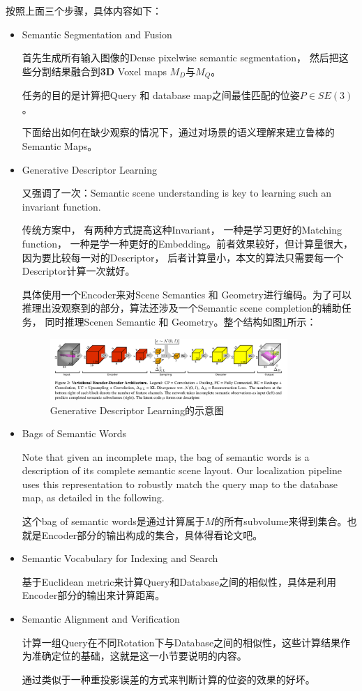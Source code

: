 按照上面三个步骤，具体内容如下：
\begin{itemize}
\item Semantic Segmentation and Fusion

首先生成所有输入图像的Dense pixelwise semantic segmentation， 然后把这些分割结果融合到\textbf{3D} Voxel maps $M_D$与$M_Q$。 

任务的目的是计算把Query 和 database map之间最佳匹配的位姿$P \in SE(3)$。

下面给出如何在缺少观察的情况下，通过对场景的语义理解来建立鲁棒的Semantic Maps。

\item Generative Descriptor Learning

又强调了一次：Semantic scene understanding is key to learning such an invariant function.

传统方案中， 有两种方式提高这种Invariant， 一种是学习更好的Matching function， 一种是学一种更好的Embedding。前者效果较好，但计算量很大，因为要比较每一对的Descriptor， 后者计算量小，本文的算法只需要每一个Descriptor计算一次就好。

具体使用一个Encoder来对Scene Semantics 和 Geometry进行编码。为了可以推理出没观察到的部分，算法还涉及一个Semantic scene completion的辅助任务， 同时推理Scenen Semantic 和 Geometry。整个结构如图\ref{SemanticVisualLoc0}所示：
\begin{figure}[!hbtp]
\centering
\includegraphics[width=0.85\textwidth]{SemanticSLAM/SemanticVisualLoc0.png}
\caption{Generative Descriptor Learning的示意图}
\label{SemanticVisualLoc0}
\end{figure}

\item Bags of Semantic Words

 Note that given an incomplete map, the bag of semantic words is a description of its complete
semantic scene layout. Our localization pipeline uses this representation to robustly match the query map to the database map, as detailed in the following.

这个bag of semantic words是通过计算属于$M$的所有subvolume来得到集合。也就是Encoder部分的输出构成的集合，具体得看论文吧。

\item Semantic Vocabulary for Indexing and Search

基于Euclidean metric来计算Query和Database之间的相似性，具体是利用Encoder部分的输出来计算距离。

\item Semantic Alignment and Verification

计算一组Query在不同Rotation下与Database之间的相似性，这些计算结果作为准确定位的基础，这就是这一小节要说明的内容。

通过类似于一种重投影误差的方式来判断计算的位姿的效果的好坏。

\end{itemize}

